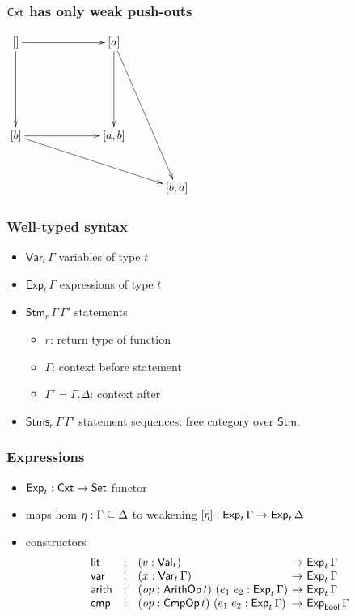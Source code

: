 \documentclass[t,fleqn,usenames,dvipsnames]{beamer}
\newcommand{\Set}{\mathsf{Set}}
\newcommand{\tVal}{\mathsf{Val}}
\newcommand{\Val}[1][]{\tVal_{#1}}
\newcommand{\Var}[2][]{\mathsf{Var}_{#1}\,#2}
\newcommand{\tExp}{\mathsf{Exp}}
\newcommand{\Exp}[2][]{\mathsf{Exp}_{#1}\,#2}
\newcommand{\tStm}{\mathsf{Stm}}
\newcommand{\Stm}[3][]{\mathsf{Stm}_{#1}\,#2\,#3}
\newcommand{\Stms}[3][]{\mathsf{Stms}_{#1}\,#2\,#3}
\newcommand{\vrt}{\mathit{r}}
\newcommand{\vop}{\mathit{op}}
\newcommand{\tlit}{\mathsf{lit}}
\newcommand{\tvar}{\mathsf{var}}
\newcommand{\tarith}{\mathsf{arith}}
\newcommand{\tcmp}{\mathsf{cmp}}
\newcommand{\tCmpOp}{\mathsf{CmpOp}}
\newcommand{\CmpOp}[1]{\tCmpOp\,#1}
\newcommand{\tArithOp}{\mathsf{ArithOp}}
\newcommand{\ArithOp}[1]{\tArithOp\,#1}
\newcommand{\sublist}{\subseteq}
\newcommand{\tbool}{\mathsf{bool}}
\begin{document}
\begin{frame}%
  \frametitle{$\mathsf{Cxt}$ has only weak push-outs}
  \begin{center}
\(
\xymatrix@=7ex{
  [] \ar[rr] \ar[dd] && [a] \ar[dd] \ar[dddr] \\
  \\
  [b] \ar[rr] \ar[drrr] && [a,b] \\
  &&& [b,a] \\
}
\)
  \end{center}
\end{frame}

\begin{frame}%
  \frametitle{Well-typed syntax}
  \vspace{-3ex}
  \begin{itemize}
  \item $\Var[t]\Gamma$ variables of type $t$
  \item $\Exp[t]\Gamma$ expressions of type $t$
  \item $\Stm[\vrt]\Gamma{\Gamma'}$ statements
    \begin{itemize}
    \item $\vrt$: return type of function
    \item $\Gamma$: context before statement
    \item $\Gamma' = \Gamma.\Delta$: context after
    \end{itemize}
  \item $\Stms[\vrt]{\Gamma}{\Gamma'}$ statement sequences: free
    category over $\tStm$.
  \end{itemize}
\end{frame}


\begin{frame}%
  \frametitle{Expressions}
  \vspace{-3ex}
  \begin{itemize}
  \item $\tExp_t : \Cxt \to \Set$ functor
  \item maps hom $\eta : \GG \sublist \GD$ to weakening
    $[\eta] : \Exp[t]\GG \to \Exp[t]\GD$
  \item constructors
\[
  \begin{array}{lcl@{~}c@{~}l}
\tlit   & : & (v : \Val[t]) & \to & \Exp[t]\Gamma \\
\tvar   & : & (x : \Var[t]\Gamma) & \to & \Exp[t]\Gamma \\
\tarith & : & (\vop : \ArithOp t)\ (e_1\;e_2 : \Exp[t]\Gamma) & \to &
              \Exp[t]\Gamma \\
\tcmp   & : & (\vop : \CmpOp t)\ (e_1\;e_2 : \Exp[t]\Gamma) & \to &
              \Exp[\tbool]\Gamma \\
  \end{array}
\]
  \end{itemize}
\end{frame}
\end{document}
